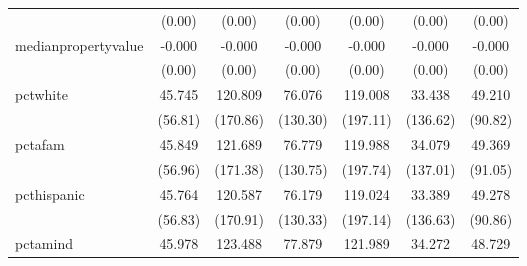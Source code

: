 {\begin{tabular}{l*{6}{c}}
            &                   (0.00)         &                   (0.00)         &                   (0.00)         &                   (0.00)         &                   (0.00)         &                   (0.00)         \\
medianpropertyvalue&                   -0.000         &                   -0.000         &                   -0.000         &                   -0.000         &                   -0.000         &                   -0.000\sym{*}  \\
            &                   (0.00)         &                   (0.00)         &                   (0.00)         &                   (0.00)         &                   (0.00)         &                   (0.00)         \\
pctwhite    &                   45.745         &                  120.809         &                   76.076         &                  119.008         &                   33.438         &                   49.210         \\
            &                  (56.81)         &                 (170.86)         &                 (130.30)         &                 (197.11)         &                 (136.62)         &                  (90.82)         \\
pctafam     &                   45.849         &                  121.689         &                   76.779         &                  119.988         &                   34.079         &                   49.369         \\
            &                  (56.96)         &                 (171.38)         &                 (130.75)         &                 (197.74)         &                 (137.01)         &                  (91.05)         \\
pcthispanic &                   45.764         &                  120.587         &                   76.179         &                  119.024         &                   33.389         &                   49.278         \\
            &                  (56.83)         &                 (170.91)         &                 (130.33)         &                 (197.14)         &                 (136.63)         &                  (90.86)         \\
pctamind    &                   45.978         &                  123.488         &                   77.879         &                  121.989         &                   34.272         &                   48.729         \\

\end{tabular}}
